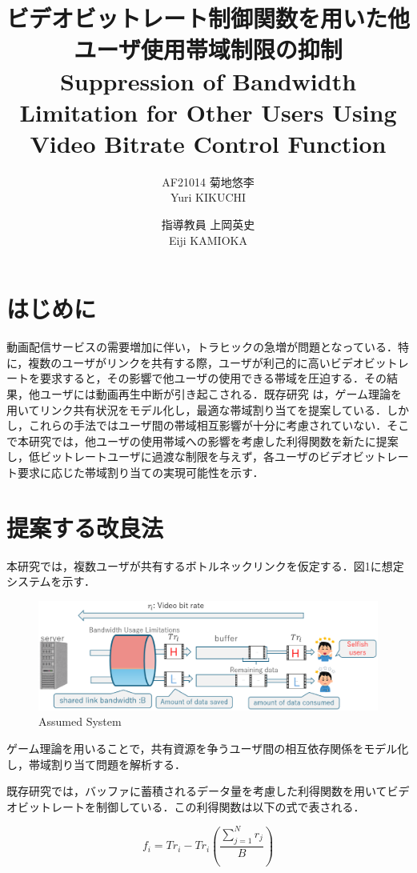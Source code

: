 \documentclass[twocolumn, a4paper]{ieicejsp}
\title{\textbf{ビデオビットレート制御関数を用いた他ユーザ使用帯域制限の抑制} \\
\normalsize{Suppression of Bandwidth Limitation for Other Users Using Video Bitrate Control Function}}
\author{
    AF21014 菊地悠李 \\ Yuri KIKUCHI \and
    指導教員 上岡英史 \\ Eiji KAMIOKA
  }
\begin{document}
\small
\maketitle


\section{はじめに}
動画配信サービスの需要増加に伴い，トラヒックの急増が問題となっている．特に，複数のユーザがリンクを共有する際，ユーザが利己的に高いビデオビットレートを要求すると，その影響で他ユーザの使用できる帯域を圧迫する．その結果，他ユーザには動画再生中断が引き起こされる．既存研究 \cite{motomoto}は，ゲーム理論を用いてリンク共有状況をモデル化し，最適な帯域割り当てを提案している．しかし，これらの手法ではユーザ間の帯域相互影響が十分に考慮されていない．そこで本研究では，他ユーザの使用帯域への影響を考慮した利得関数を新たに提案し，低ビットレートユーザに過渡な制限を与えず，各ユーザのビデオビットレート要求に応じた帯域割り当ての実現可能性を示す．



\section{提案する改良法}
本研究では，複数ユーザが共有するボトルネックリンクを仮定する．図1に想定システムを示す．

\begin{figure}[h]
  \centering
  \includegraphics[scale=0.16]{sisutemu.eps}
            {Assumed System}
\end{figure}

ゲーム理論を用いることで，共有資源を争うユーザ間の相互依存関係をモデル化し，帯域割り当て問題を解析する．

既存研究\cite{motomoto}では，バッファに蓄積されるデータ量を考慮した利得関数を用いてビデオビットレートを制御している．この利得関数は以下の式で表される．

\begin{equation} 
    f_i=Tr_i-Tr_i\left(\frac{\sum^N_{j=1}r_j}{B}\right) 
\end{equation}
\end{document}

